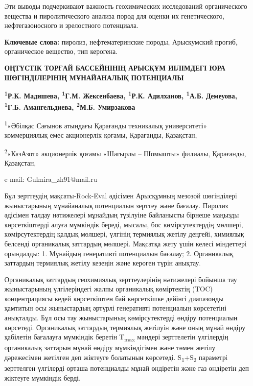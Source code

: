 Эти выводы подчеркивают важность геохимических исследований
органического вещества и пиролитического анализа пород для оценки их
генетического, нефтегазоносного и зрелостного потенциала.

{\bfseries Ключевые слова:} пиролиз, нефтематеринские породы, Арыскумский
прогиб, органическое вещество, тип керогена.

\begin{center}
{\large\bfseries ОҢТҮСТІК ТОРҒАЙ БАССЕЙНІНІҢ АРЫСҚҰМ ИІЛІМДЕГІ ЮРА ШӨГІНДІЛЕРІНІҢ
МҰНАЙАНАЛЫҚ ПОТЕНЦИАЛЫ}

{\bfseries \textsuperscript{1}Р.К. Мадишева, \textsuperscript{1}Г.М.
Жексенбаева\envelope, \textsuperscript{1}Р.К. Адилханов,
\textsuperscript{1}А.Б. Демеуова,\\
\textsuperscript{1}Г.Б. Амангельдиева, \textsuperscript{2}М.Б.
Умирзакова}

\textsuperscript{1}«Әбілқас Сағынов атындағы Қарағанды техникалық
университеті» коммерциялық емес акционерлік қоғамы, Қарағанды,
Қазақстан,

\textsuperscript{2}«КазАзот» акционерлік қоғамы «Шагырлы -- Шомышты»
филиалы, Қарағанды, Қазақстан,

e-mail: Gulmira\_zh91@mail.ru
\end{center}

Бұл зерттеудің мақсаты-Rock-Eval әдісімен Арысқұмның мезозой шөгінділері
жыныстарының мұнайаналық потенциалын зерттеу және бағалау. Пиролиз
әдісімен талдау нәтижелері мұнайдың түзілуіне байланысты бірнеше маңызды
көрсеткіштерді алуға мүмкіндік береді, мысалы, бос көмірсутектердің
мөлшері, көмірсутектердің қалдық мөлшері, үлгінің термиялық жетілу
деңгейі, химиялық белсенді органикалық заттардың мөлшері. Мақсатқа жету
үшін келесі міндеттері орындалды: 1. Мұнайдың генеративті потенциалын
бағалау; 2. Органикалық заттардың термиялық жетілу кезеңін және кероген
түрін анықтау.

Органикалық заттардың геохимиялық зерттеулерінің нәтижелері бойынша тау
жыныстарының үлгілеріндегі жалпы органикалық көміртектің (TOC)
концентрациясы кедей көрсеткіштен бай көрсеткішке дейінгі диапазонды
қамтитын осы жыныстардың әртүрлі генеративті потенциалын көрсететіні
анықталды. Бұл осы тау жыныстарының көмірсутектерді өндіру потенциалын
көрсетеді. Органикалық заттардың термиялық жетілуін және оның мұнай
өндіру қабілетін бағалауға мүмкіндік беретін T\textsubscript{max}
мәндері зерттелетін үлгілердің органикалық заттарын мұнай өндіру
мүмкіндігімен және төмен жетілу дәрежесімен жетілген деп жіктеуге
болатынын көрсетеді. S\textsubscript{1}+S\textsubscript{2} параметрі
зерттелген үлгілерді орташа потенциалды мұнай өндіретін және газ
өндіретін деп жіктеуге мүмкіндік берді.


